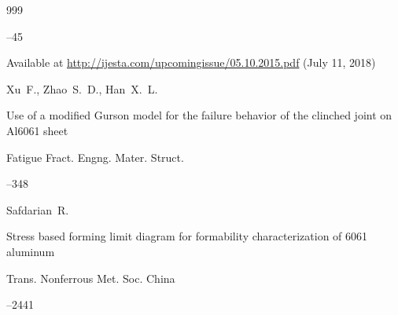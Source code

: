 \begin{thebibliography}{999}



--45

\elink  Available at \url{http://ijesta.com/upcomingissue/05.10.2015.pdf} (July 11, 2018)






\by Xu~F., Zhao~S.~D., Han~X.~L.

\paper Use of a modified Gurson model for the failure behavior of the clinched joint on Al6061 sheet

\jour Fatigue Fract. Engng. Mater. Struct.




--348






\by Safdarian~R.

\paper Stress based forming limit diagram for formability characterization of 6061 aluminum

\jour Trans. Nonferrous Met. Soc. China




--2441







\end{thebibliography}









\newpage



\makeentitle








